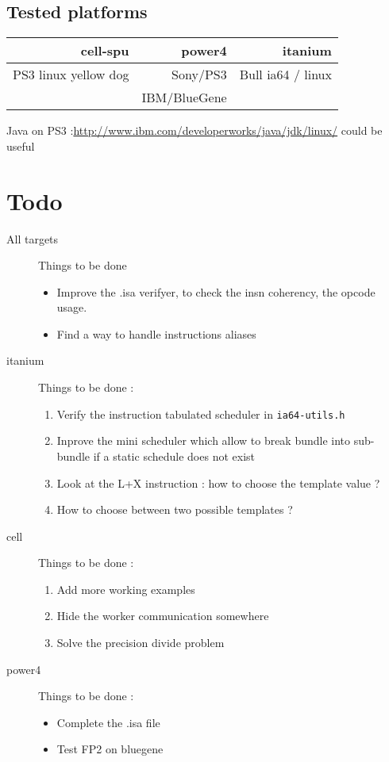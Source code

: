 \documentclass{article}
\begin{document}
\subsection{Tested platforms}

\begin{tabular}{|r r r|} \hline
  cell-spu 		& power4       & itanium           \\ \hline
  PS3 linux yellow dog  & Sony/PS3     & Bull ia64 / linux \\
                        & IBM/BlueGene &	           \\ \hline
\end{tabular}

Java on PS3 :\url{http://www.ibm.com/developerworks/java/jdk/linux/} could be useful

\section{Todo}

\begin{description}
\item[All targets] Things to be done
  \begin{itemize}
  \item Improve the .isa verifyer, to check the insn coherency, the opcode
    usage.
  \item Find a way to handle instructions aliases
  \end{itemize}
\item[itanium] Things to be done :
  \begin{enumerate}
  \item Verify the instruction tabulated scheduler in \texttt{ia64-utils.h}
  \item Inprove the mini scheduler which allow to break bundle into
    sub-bundle if a static schedule does not exist
  \item Look at the L+X instruction : how to choose the template value ?
  \item How to choose between two possible templates ?
  \end{enumerate}
\item[cell] Things to be done :
  \begin{enumerate}
  \item Add more working examples
  \item Hide the worker communication somewhere
  \item Solve the precision divide problem
  \end{enumerate}
\item[power4]  Things to be done :
  \begin{itemize}
  \item Complete the .isa file
  \item Test  FP2 on bluegene
  \end{itemize}
\end{description}
\end{document}
